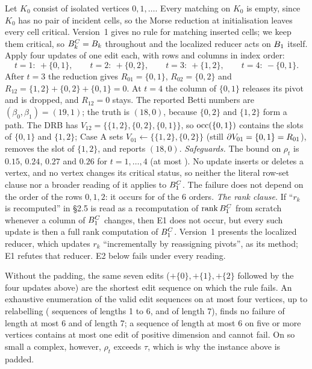 \begin{example}\label{ex:e1-simplicial}
Let $K_0$ consist of \RefEOneVOnePad{} isolated vertices $0,1,\dots$. Every
matching on $K_0$ is empty, since $K_0$ has no pair of incident cells, so the
Morse reduction at initialisation leaves every cell critical. Version~1 gives no
rule for matching inserted cells; we keep them critical, so $B_{k}^C=B_{k}$
throughout and the localized reducer acts on $B_{1}$ itself. Apply four
updates of one edit each, with rows and columns in index order:
\[
  t=1{:}\ {+}\{0,1\},\qquad t=2{:}\ {+}\{0,2\},\qquad t=3{:}\ {+}\{1,2\},\qquad
  t=4{:}\ {-}\{0,1\}.
\]
After $t=3$ the reduction gives $R_{01}=\{0,1\}$, $R_{02}=\{0,2\}$ and
$R_{12}=\{1,2\}+\{0,2\}+\{0,1\}=0$. At $t=4$ the column of $\{0,1\}$ releases its
pivot and is dropped, and $R_{12}=0$ stays. The reported Betti numbers are
$(\beta_0,\beta_1)=(19,1)$; the truth is $(18,0)$, because $\{0,2\}$ and
$\{1,2\}$ form a path. The DRB has $V_{12}=\{\{1,2\},\{0,2\},\{0,1\}\}$, so
$\operatorname{occ}(\{0,1\})$ contains the slots of $\{0,1\}$ and $\{1,2\}$; Case A sets
$V_{01}\gets\{\{1,2\},\{0,2\}\}$ (still $\partial V_{01}=\{0,1\}=R_{01}$), removes the
slot of $\{1,2\}$, and reports $(18,0)$.
\emph{Safeguards.} The bound on $\rho_t$ is $0.15$, $0.24$, $0.27$ and $0.26$
for $t=1,\dots,4$ (at most \RefEOneVOneRhoMax). No update inserts or deletes a
vertex, and no vertex changes its critical status, so neither the literal
row-set clause nor a broader reading of it applies to $B_{1}^C$. The failure
does not depend on the order of the rows $0,1,2$: it occurs for
\RefEOneVOneRowOrders{} of the 6 orders.
\emph{The rank clause.} If ``$r_k$ is recomputed'' in \S2.5 is read as a
recomputation of $\operatorname{rank}B_{1}^C$ from scratch whenever a column of $B_{1}^C$
changes, then E1 does not occur, but every such update is then a full rank
computation of $B_{1}^C$. Version~1 presents the localized reducer, which
updates $r_k$ ``incrementally by reassigning pivots'', as its method; E1 refutes
that reducer. E2 below fails under every reading.
\end{example}

Without the padding, the same seven edits ($+\{0\},+\{1\},+\{2\}$ followed by
the four updates above) are the shortest edit sequence on which the rule fails.
An exhaustive enumeration of the valid edit sequences on at most four
vertices, up to relabelling (\RefEOneCountsShort{} sequences of lengths 1 to 6,
and \RefEOneCountSeven{} of length 7), finds no failure of length at most 6 and
\RefEOneFailSeven{} of length 7; a sequence of length at most 6 on five or more
vertices contains at most one edit of positive dimension and cannot fail. On so
small a complex, however, $\rho_t$ exceeds $\tau$, which is why the instance above
is padded.

